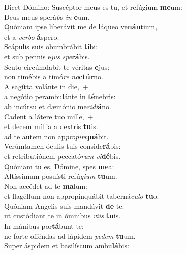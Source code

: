 \evenverse Dicet Dómino: Suscéptor meus es tu, et refúgium \textbf{me}um:~\*\\
\evenverse Deus meus sperá\textit{bo} \textit{in} \textbf{e}um.\\
\oddverse Quóniam ipse liberávit me de láqueo ve\textbf{nán}tium,~\*\\
\oddverse et a \textit{ver}\textit{bo} \textbf{á}spero.\\
\evenverse Scápulis suis obumbrábit \textbf{ti}bi:~\*\\
\evenverse et sub pennis e\textit{jus} \textit{spe}\textbf{rá}bis.\\
\oddverse Scuto circúmdabit te véritas \textbf{e}jus:~\*\\
\oddverse non timébis a timó\textit{re} \textit{no}\textbf{ctúr}no.\\
\evenverse A sagítta volánte in die,~+\\
\evenverse  a negótio perambulánte in \textbf{té}nebris:~\*\\
\evenverse ab incúrsu et dæmónio me\textit{ri}\textit{di}\textbf{á}no.\\
\oddverse Cadent a látere tuo mille,~+\\
\oddverse  et decem míllia a dextris \textbf{tu}is:~\*\\
\oddverse ad te autem non ap\textit{pro}\textit{pin}\textbf{quá}bit.\\
\evenverse Verúmtamen óculis tuis conside\textbf{rá}bis:~\*\\
\evenverse et retributiónem peccató\textit{rum} \textit{vi}\textbf{dé}bis.\\
\oddverse Quóniam tu es, Dómine, spes \textbf{me}a:~\*\\
\oddverse Altíssimum posuísti refú\textit{gi}\textit{um} \textbf{tu}um.\\
\evenverse Non accédet ad te \textbf{ma}lum:~\*\\
\evenverse et flagéllum non appropinquábit taberná\textit{cu}\textit{lo} \textbf{tu}o.\\
\oddverse Quóniam Angelis suis mandávit \textbf{de} te:~\*\\
\oddverse ut custódiant te in ómnibus \textit{vi}\textit{is} \textbf{tu}is.\\
\evenverse In mánibus por\textbf{tá}bunt te:~\*\\
\evenverse ne forte offéndas ad lápidem \textit{pe}\textit{dem} \textbf{tu}um.\\
\oddverse Super áspidem et basilíscum ambu\textbf{lá}bis:~\*\\
